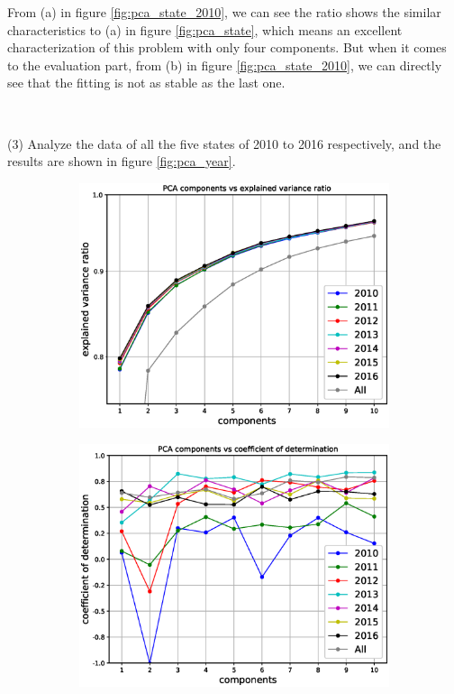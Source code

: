 \documentclass{mcmthesis}
\begin{document}
From (a) in figure \ref{fig:pca_state_2010}, we can see the ratio shows the similar characteristics to (a) in figure \ref{fig:pca_state}, which means an excellent characterization of this problem with only four components. But when it comes to the evaluation part, from (b) in figure \ref{fig:pca_state_2010}, we can directly see that the fitting is not as stable as the last one.

~\smallskip

(3) Analyze the data of all the five states of 2010 to 2016 respectively, and the results are shown in figure \ref{fig:pca_year}.
    \begin{figure}[H]
    \centering
    \begin{subfigure}[b]{0.49\textwidth}
        \includegraphics[width=\textwidth]{../figure/pca_year_ratio.eps}
        \label{fig:pca_year_ratio}
    \end{subfigure}
    \begin{subfigure}[b]{0.49\textwidth}
        \includegraphics[width=\textwidth]{../figure/pca_year_score.eps}

\end{subfigure}
\end{figure}
\end{document}
